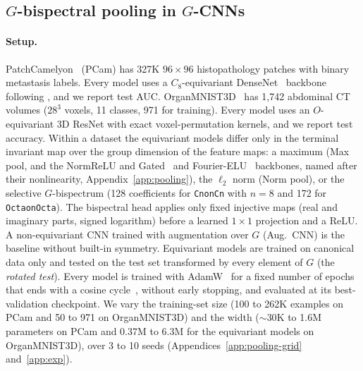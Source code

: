 \documentclass{article}
\theoremstyle{definition}
\theoremstyle{remark}
\theoremstyle{definition}
\begin{document}
\subsection{$G$-bispectral pooling in $G$-CNNs}
\label{sec:pooling}

\paragraph{Setup.}
PatchCamelyon~\citep{veeling2018rotation} (PCam) has 327K $96{\times}96$ histopathology
patches with binary metastasis labels. Every model uses a $C_8$-equivariant
DenseNet~\citep{huang2017densenet} backbone following \citet{veeling2018rotation}, and we
report test AUC. OrganMNIST3D~\citep{medmnistv2} has 1{,}742 abdominal CT volumes ($28^3$
voxels, 11 classes, 971 for training). Every model uses an $O$-equivariant 3D ResNet with
exact voxel-permutation kernels, and we report test accuracy. Within a dataset the
equivariant models differ only in the terminal invariant map over the group dimension of the
feature maps: a maximum (Max pool, and the NormReLU and Gated~\citep{weiler2019general} and
Fourier-ELU~\citep{cesa2022program} backbones, named after their nonlinearity,
Appendix~\ref{app:pooling}), the $\ell_2$ norm (Norm pool),
or the selective $G$-bispectrum (128 coefficients for \texttt{CnonCn} with $n{=}8$ and 172 for
\texttt{OctaonOcta}). The bispectral head applies only fixed injective maps (real and
imaginary parts, signed logarithm) before a learned $1{\times}1$ projection and a ReLU. A
non-equivariant CNN trained with augmentation over $G$ (Aug.\ CNN) is the baseline without
built-in symmetry. Equivariant models are trained on canonical data only and tested on the
test set transformed by every element of $G$ (the \emph{rotated test}). Every model is trained
with AdamW~\citep{loshchilov2019adamw} for a fixed number of epochs that ends with a cosine
cycle~\citep{loshchilov2017sgdr}, without early stopping, and evaluated at its
best-validation checkpoint. We vary the training-set size
(100 to 262K examples on PCam and 50 to 971 on OrganMNIST3D) and the width (${\sim}30$K to
1.6M parameters on PCam and 0.37M to 6.3M for the equivariant models on OrganMNIST3D), over 3 to 10 seeds
(Appendices~\ref{app:pooling-grid} and~\ref{app:exp}).
\end{document}
